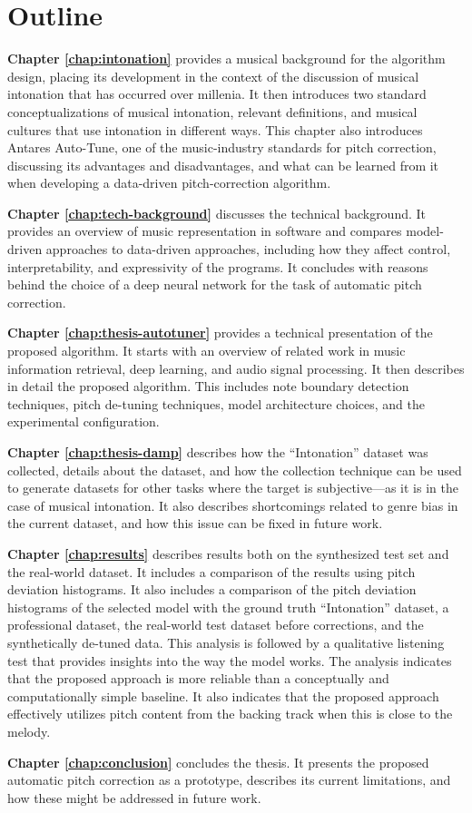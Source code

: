 \section{Outline}
\textbf{Chapter \ref{chap:intonation}} provides a musical background for the algorithm design, placing its development in the context of the discussion of musical intonation that has occurred over millenia. It then introduces two standard conceptualizations of musical intonation, relevant definitions, and musical cultures that use intonation in different ways. This chapter also introduces Antares Auto-Tune, one of the music-industry standards for pitch correction, discussing its advantages and disadvantages, and what can be learned from it when developing a data-driven pitch-correction algorithm. 

\textbf{Chapter \ref{chap:tech-background}} discusses the technical background. It provides an overview of music representation in software and compares model-driven approaches to data-driven approaches, including how they affect control, interpretability, and expressivity of the programs. It concludes with reasons behind the choice of a deep neural network for the task of automatic pitch correction.

\textbf{Chapter \ref{chap:thesis-autotuner}} provides a technical presentation of the proposed algorithm. It starts with an overview of related work in music information retrieval, deep learning, and audio signal processing. It then describes in detail the proposed algorithm. This includes note boundary detection techniques, pitch de-tuning techniques, model architecture choices, and the experimental configuration.

\textbf{Chapter \ref{chap:thesis-damp}} describes how the ``Intonation'' dataset was collected, details about the dataset, and how the collection technique can be used to generate datasets for other tasks where the target is subjective---as it is in the case of musical intonation. It also describes shortcomings related to genre bias in the current dataset, and how this issue can be fixed in future work.

\textbf{Chapter \ref{chap:results}} describes results both on the synthesized test set and the real-world dataset. It includes a comparison of the results using pitch deviation histograms. It also includes a comparison of the pitch deviation histograms of the selected model with the ground truth ``Intonation'' dataset, a professional dataset, the real-world test dataset before corrections, and the synthetically de-tuned data. This analysis is followed by a qualitative listening test that provides insights into the way the model works. The analysis indicates that the proposed approach is more reliable than a conceptually and computationally simple baseline. It also indicates that the proposed approach effectively utilizes pitch content from the backing track when this is close to the melody.

\textbf{Chapter \ref{chap:conclusion}} concludes the thesis. It presents the proposed automatic pitch correction as a prototype, describes its current limitations, and how these might be addressed in future work.
